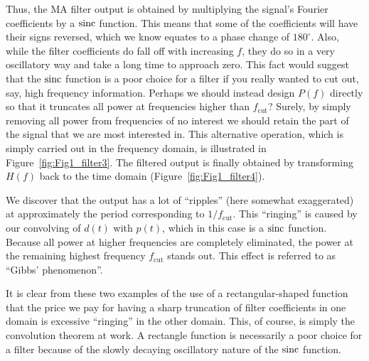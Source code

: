 \noindent
Thus, the MA filter output is obtained by multiplying the signal's Fourier coefficients by a $\operatorname{sinc}$ function.  This 
means that some of the coefficients will have their signs reversed, which we know equates to a 
phase change of $180^{\circ}$.  Also, while the filter coefficients do fall off with increasing $f$, they do so in a very 
oscillatory way and take a long time to approach zero.  This fact would suggest that the $\operatorname{sinc}$ function is a 
poor choice for a filter if you really wanted to cut out, say, high frequency information.  Perhaps we 
should instead design $P(f)$ directly so that it truncates all power at frequencies higher than $f_{\mbox{cut}}$?
Surely, by simply removing all power from frequencies of no interest we should retain the part of the signal
that we are most interested in.
This alternative operation, which is simply carried out in the frequency domain, is illustrated in Figure~\ref{fig:Fig1_filter3}.
The filtered output is finally obtained by transforming $H(f)$ back to the time domain (Figure~\ref{fig:Fig1_filter4}).

We discover that the output has a lot of ``ripples'' (here somewhat exaggerated) at approximately the period corresponding to $1/f_{\mbox {cut}}$.  
This ``ringing'' is caused by our convolving of $d(t)$ with $p(t)$, which in this case is a $\operatorname{sinc}$ function.  Because all power 
at higher frequencies are completely eliminated, the power at the remaining highest frequency $f_{\mbox{cut}}$
stands out.  This effect is referred to as ``Gibbs' phenomenon''.

	It is clear from these two examples of the use of a rectangular-shaped function that the price we 
pay for having a sharp truncation of filter coefficients in one domain is excessive ``ringing'' in the 
other domain.  This, of course, is simply the convolution theorem at work.  A rectangle function 
is necessarily a poor choice for a filter because of the slowly decaying oscillatory nature of the 
$\operatorname{sinc}$ function.


